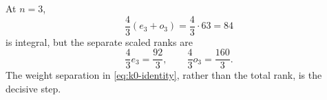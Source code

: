 \begin{remark}
\label{rem:total-rank}
At \(n=3\),
\[
\frac43(e_3+o_3)=\frac43\cdot63=84
\]
is integral, but the separate scaled ranks are
\[
\frac43e_3=\frac{92}{3},\qquad
\frac43o_3=\frac{160}{3}.
\]
The weight separation in \eqref{eq:k0-identity}, rather than the total
rank, is the decisive step.
\end{remark}
